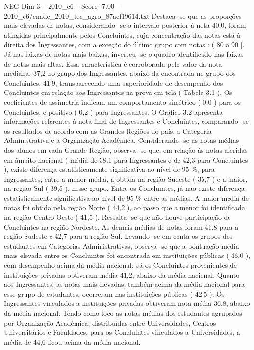 \begin{textsample}{NEG Dim 3 – 2010\_c6 – Score -7.00 – 2010\_c6/enade\_2010\_tec\_agro\_87acf19614.txt}
Destaca -se que as proporções mais elevadas de notas, considerando -se o intervalo posterior à nota 40,0, foram atingidas principalmente pelos Concluintes, cuja concentração das notas está à direita dos Ingressantes, com a exceção do último grupo com notas : ( 80 a 90 ].
Já nas faixas de notas mais baixas, inverteu -se o quadro identificado nas faixas de notas mais altas.
Essa característica é corroborada pelo valor da nota mediana, 37,2 no grupo dos Ingressantes, abaixo da encontrada no grupo dos Concluintes, 41,9, transparecendo uma superioridade de desempenho dos Concluintes em relação aos Ingressantes na prova em tela ( Tabela 3.1 ).
Os coeficientes de assimetria indicam um comportamento simétrico ( 0,0 ) para os Concluintes, e positivo ( 0,2 ) para Ingressantes.
O Gráfico 3.2 apresenta informações referentes à nota final de Ingressantes e Concluintes, comparando -se os resultados de acordo com as Grandes Regiões do país, a Categoria Administrativa e a Organização Acadêmica.
Considerando -se as notas médias dos alunos em cada Grande Região, observa -se que, em relação às notas aferidas em âmbito nacional ( média de 38,1 para Ingressantes e de 42,3 para Concluintes ), existe diferença estatisticamente significativa ao nível de 95 \%, para Ingressantes, entre a menor média, a obtida na região Sudeste ( 35,7 ) e a maior, na região Sul ( 39,5 ), nesse grupo.
Entre os Concluintes, já não existe diferença estatisticamente significativa ao nível de 95 \% entre as médias.
A maior média de notas foi obtida pela região Norte ( 44,2 ), ao passo que a menor foi identificada na região Centro-Oeste ( 41,5 ).
Ressalta -se que não houve participação de Concluintes na região Nordeste.
As demais médias de notas foram 41,8 para a região Sudeste e 42,7 para a região Sul.
Levando -se em conta os grupos dos estudantes em Categorias Administrativas, observa -se que a pontuação média mais elevada entre os Concluintes foi encontrada em instituições públicas ( 46,0 ), com desempenho acima da média nacional.
Já os Concluintes provenientes de instituições privadas obtiveram média 41,2, abaixo da média nacional.
Quanto aos Ingressantes, as notas mais elevadas, também acima da média nacional para esse grupo de estudantes, ocorreram nas instituições públicas ( 42,5 ).
Os Ingressantes vinculados a instituições privadas obtiveram nota média 36,8, abaixo da média nacional.
Tendo como foco as notas médias dos estudantes agrupados por Organização Acadêmica, distribuídas entre Universidades, Centros Universitários e Faculdades, para os Concluintes vinculados a Universidades, a média de 44,6 ficou acima da média nacional.

\end{textsample}
